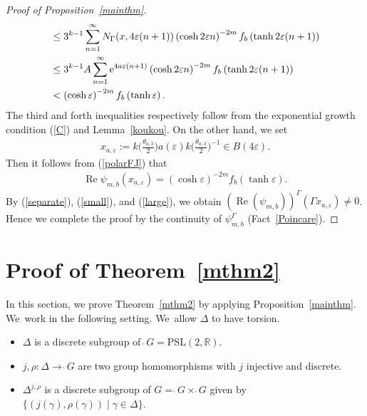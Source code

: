 \documentclass[10pt,a4paper]{amsart}
\numberwithin{equation}{section}
\begin{document}
\begin{proof}[Proof of Proposition~\ref{mainthm}]
\begin{align}
&\leq 3^{k-1}\sum_{n = 1}^{\infty} N_{\Gamma}(x, 4\varepsilon (n + 1))\left(\cosh
2\varepsilon n \right)^{-2m} f_{b}\left(\tanh 2\varepsilon (n+1)\right)
\nonumber \\
&\leq 3^{k-1}A\sum_{n = 1}^{\infty} {\rm e}^{4a\varepsilon (n+1)}\left(\cosh 2\varepsilon n
\right)^{-2m} f_{b}\left(\tanh 2\varepsilon (n+1)\right)
\nonumber \\
&< \left(\cosh \varepsilon\right)^{-2m} f_{b}
\left(\tanh \varepsilon\right).
\label{small}
\end{align}
The third and forth inequalities respectively follow from
the exponential growth condition (\ref{C}) and Lemma~\ref{koukou}.
On the other hand, we set
\begin{gather*}
x_{a,\varepsilon}:=
k\bigg(\frac{\theta_{a,3}}{2}\bigg)a(\varepsilon)k\bigg(\frac{\theta_{a,3}}{2}\bigg)^{-1} \in B(4\varepsilon).
\end{gather*}
Then it follows from (\ref{polarFJ}) that
\begin{align}
\label{large}
\operatorname{Re} \psi_{m,b}(x_{a,\varepsilon})
=\left(\cosh \varepsilon\right)^{-2m} f_{b}
\left(\tanh \varepsilon\right).
\end{align}
By (\ref{separate}), (\ref{small}), and (\ref{large}),
we obtain $(\operatorname{Re}(\psi_{m,b}))^{\Gamma}(\Gamma x_{a,\varepsilon})\neq 0$.
Hence we complete the proof
by the continuity of $\psi_{m,b}^{\Gamma}$ (Fact~\ref{Poincare}).
\end{proof}

\section{Proof of Theorem~\ref{mthm2}}
\label{proof-thm2-section}
In this section, we prove Theorem~\ref{mthm2}
by applying Proposition~\ref{mainthm}. We~work in the following setting. We~allow $\Delta$ to have torsion.
\begin{Setting}\quad
\label{setting}
\begin{itemize}\itemsep=0pt
\item
$\Delta$ is a discrete subgroup of $\grave{\ }G = \mathrm{PSL}(2,\mathbb{R})$.
\item
$j, \rho\colon\Delta\rightarrow\grave{\ }G$ are two group homomorphisms
with $j$ injective and discrete.
\item
$\Delta^{j,\rho}$ is a discrete subgroup of $G=\grave{\ }G\times\grave{\ }G$
given by $\{(j(\gamma),\rho(\gamma)) \mid \gamma \in \Delta\}$.
\end{itemize}
\end{Setting}
\end{document}
